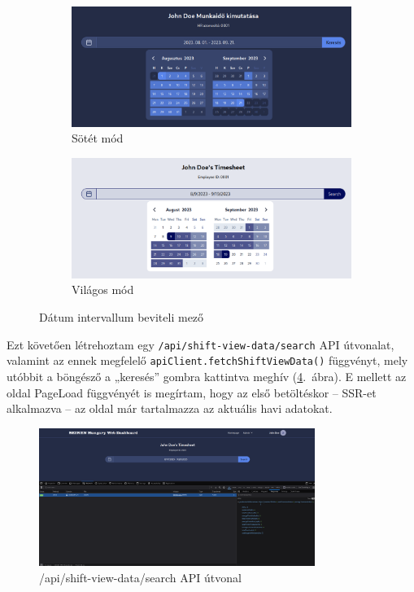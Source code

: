 \documentclass[a4paper]{article}
\newcommand{\inltxt}[1]{\texttt{#1}}
\begin{document}
\begin{figure}[ht]
    \centering
    \begin{subfigure}[b]{0.45\textwidth}
        \centering
        \includegraphics[clip, trim=25 0 25 0, width=1\textwidth]{images/calendar-dark.png}
        \caption{Sötét mód}
        \label{fig:calendar_dark}
    \end{subfigure}
    \hfill
    \begin{subfigure}[b]{0.45\textwidth}
        \centering
        \includegraphics[clip, trim=25 0 25 0, width=1\textwidth]{images/calendar-light.png}
        \caption{Világos mód}
        \label{fig:calendar_light}
    \end{subfigure}
    \caption{Dátum intervallum beviteli mező}
    \label{fig:calendars}
\end{figure}

Ezt követően létrehoztam egy \inltxt{/api/shift-view-data/search} API útvonalat, valamint az ennek
megfelelő \inltxt{apiClient.fetchShiftViewData()} függvényt, mely utóbbit a böngésző a „keresés”
gombra kattintva meghív (\ref{fig:timesheet_search}.~ábra). E mellett az oldal PageLoad függvényét is megírtam, hogy az első
betöltéskor – SSR-et alkalmazva – az oldal már tartalmazza az aktuális havi adatokat.

\begin{figure}[ht]
  \centering
  \includegraphics[width = 0.8\textwidth]{images/timesheet_search.png}
  \caption{/api/shift-view-data/search API útvonal}
  \label{fig:timesheet_search}
\end{figure}
\end{document}
